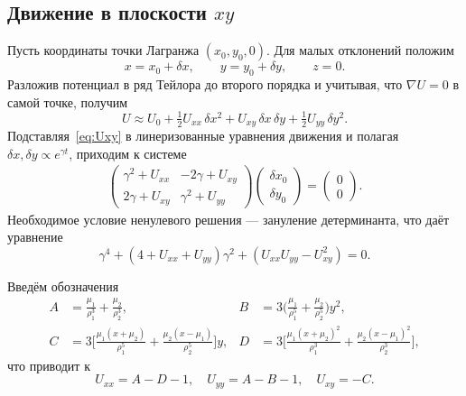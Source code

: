 \documentclass[12pt]{article}
\newcommand{\muone}{\mu_1}
\newcommand{\mutwo}{\mu_2}
\begin{document}
\subsection{Движение в плоскости $xy$}
Пусть координаты точки Лагранжа $(x_0,y_0,0)$. Для малых отклонений положим
\begin{equation}\tag{1097--1099}
  x=x_0+\delta x,\qquad y=y_0+\delta y,\qquad z=0.
\end{equation}
Разложив потенциал в ряд Тейлора до второго порядка и учитывая, что $\nabla U=0$ в самой точке, получим
\begin{equation}\tag{1101}\label{eq:Uxy}
  U\approx U_0+\tfrac12 U_{xx}\,\delta x^{2}+U_{xy}\,\delta x\,\delta y+\tfrac12 U_{yy}\,\delta y^{2}.
\end{equation}
Подставляя~\eqref{eq:Uxy} в линеризованные уравнения движения и полагая $\delta x,\delta y\propto e^{\gamma t}$, приходим к системе
\begin{align}\tag{1104}\label{eq:matrix}
  \begin{pmatrix}
    \gamma^{2}+U_{xx} & -2\gamma+U_{xy}\\[4pt]
    2\gamma+U_{xy} & \gamma^{2}+U_{yy}
  \end{pmatrix}
  \begin{pmatrix}\delta x_0\\ \delta y_0\end{pmatrix}=\begin{pmatrix}0\\0\end{pmatrix}.
\end{align}
Необходимое условие ненулевого решения — зануление детерминанта, что даёт уравнение
\begin{equation}\tag{1105}\label{eq:quartic}
  \gamma^{4}+(4+U_{xx}+U_{yy})\gamma^{2}+(U_{xx}U_{yy}-U_{xy}^{2})=0.
\end{equation}

Введём обозначения
\begin{align}\tag{1106--1109}
  A &= \frac{\muone}{\rho_1^{3}}+\frac{\mutwo}{\rho_2^{3}}, &
  B &= 3\bigl(\frac{\muone}{\rho_1^{5}}+\frac{\mutwo}{\rho_2^{5}}\bigr)y^{2},\\
  C &= 3\bigl[\frac{\muone(x+\mutwo)}{\rho_1^{5}}+\frac{\mutwo(x-\muone)}{\rho_2^{5}}\bigr]y, &
  D &= 3\bigl[\frac{\muone(x+\mutwo)^{2}}{\rho_1^{3}}+\frac{\mutwo(x-\muone)^{2}}{\rho_2^{3}}\bigr],
\end{align}
что приводит к
\begin{equation}\tag{1110--1112}
  U_{xx}=A-D-1,\quad U_{yy}=A-B-1,\quad U_{xy}=-C.
\end{equation}
\end{document}
